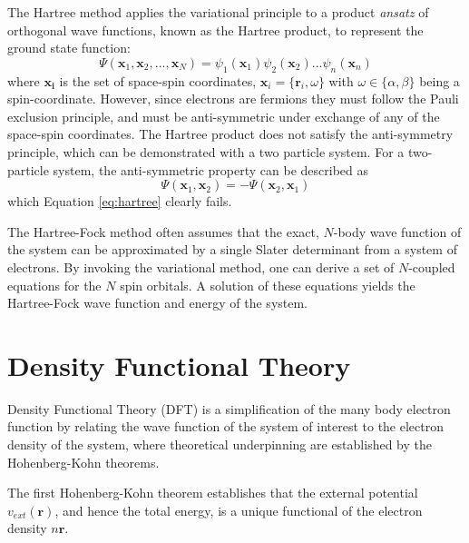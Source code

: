 The Hartree method\cite{hartree1928_hartree,slater1928_hartree,gaunt1928_hartree} applies the variational principle to a product \emph{ansatz} of orthogonal wave functions, known as the Hartree product, to represent the ground state function:
\begin{equation}
\label{eq:hartree}
	\Psi(\bm{x}_1,\bm{x}_2,...,\bm{x}_N)=\psi_1(\bm{x}_1)\psi_2(\bm{x}_2)...\psi_n(\bm{x}_n)
\end{equation}
where $\bm{x_i}$ is the set of space-spin coordinates, $\bm{x}_i=\{\bm{r}_i,\omega\}$ with $\omega \in \{\alpha,\beta\}$ being a spin-coordinate.
However, since electrons are fermions they must follow the Pauli exclusion principle, and must be anti-symmetric under exchange of any of the space-spin coordinates.  The Hartree product does not satisfy the anti-symmetry principle\cite{slater1930_antisymmetry,fock1930_antisymmetry}, which can be demonstrated with a two particle system.  For a two-particle system, the anti-symmetric property can be described as
\begin{equation}
\label{eq:antisymmetry}
	\Psi(\bm{x}_1,\bm{x}_2) = -\Psi(\bm{x}_2,\bm{x}_1)
\end{equation}
which Equation \ref{eq:hartree} clearly fails.

The Hartree-Fock method often assumes that the exact, $N$-body wave function of the system can be approximated by a single Slater determinant from a system of electrons.  By invoking the variational method, one can derive a set of $N$-coupled equations for the $N$ spin orbitals.  A solution of these equations yields the Hartree-Fock wave function and energy of the system.

\section{Density Functional Theory}

Density Functional Theory (DFT) is a simplification of the many body electron function by relating the wave function of the system of interest to the electron density of the system, where theoretical underpinning are established by the Hohenberg-Kohn theorems\cite{hohenberg1964_dft}.

The first Hohenberg-Kohn theorem establishes that the external potential $v_{ext}(\bm{r})$, and hence the total energy, is a unique functional of the electron density $n{\bm{r}}$.

